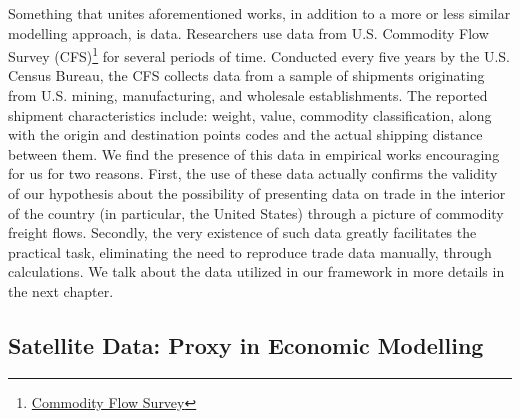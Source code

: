 Something that unites aforementioned works, in addition to a more or less similar modelling approach, is data. Researchers \parencite{hillberry2003intranational, millimet2007state, coughlin2013international, crafts2014geography} use data from U.S. Commodity Flow Survey (CFS)\footnote{ \href{https://www.bts.gov/cfs}{Commodity Flow Survey}} for several periods of time. Conducted every five years by the U.S. Census Bureau, the CFS collects data from a sample of shipments originating from U.S. mining, manufacturing, and wholesale establishments. The reported shipment characteristics include: weight, value, commodity classification, along with the origin and destination points codes and the actual shipping distance between them. We find the presence of this data in empirical works encouraging for us for two reasons. First, the use of these data actually confirms the validity of our hypothesis about the possibility of presenting data on trade in the interior of the country (in particular, the United States) through a picture of commodity freight flows. Secondly, the very existence of such data greatly facilitates the practical task, eliminating the need to reproduce trade data manually, through calculations. We talk about the data utilized in our framework in more details in the next chapter.

\subsection{Satellite Data: Proxy in Economic Modelling}

